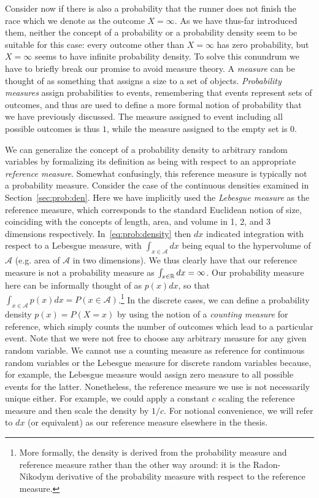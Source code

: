 Consider now if there is also a probability that the runner does not finish the race which
we denote as the outcome $X=\infty$.  As we
have thus-far introduced them, neither the concept of a probability or a probability density
seem to be suitable for this case: every outcome other than $X=\infty$ has zero probability,
but $X=\infty$ seems to have infinite probability density.  To solve this conundrum we 
have to briefly break our promise to avoid measure theory.  A \emph{measure} can be thought of
as something that assigns a size to a set of objects.
\emph{Probability measures} assign probabilities to events, remembering that events represent 
sets of outcomes, and thus are used to define a more formal notion of probability that we have
previously discussed. 
The measure assigned to event including all possible outcomes is thus $1$,
while the measure assigned to the empty set is $0$.  

We can generalize the concept of a probability density to arbitrary random variables
by formalizing its definition as being with respect to an appropriate \emph{reference measure}.  Somewhat confusingly,
this reference measure  is typically not a probability measure.  Consider the case of the continuous densities examined
in Section~\ref{sec:prob:den}.
Here we have implicitly used the \emph{Lebesgue measure} as the reference measure, which corresponds to
the standard Euclidean notion of size, coinciding with the concepts of length, area, and
volume in 1, 2, and 3 dimensions respectively.  In~\eqref{eq:prob:density} then $dx$ indicated 
integration with respect to a Lebesgue measure, with $\int_{x\in\mathcal{A}} dx$ being equal
to the hypervolume of $\mathcal{A}$ (e.g. area of $\mathcal{A}$ in two dimensions).  We thus
clearly have that our reference measure is not a probability measure as $\int_{x\in\mathbb{R}} dx = \infty$.
Our probability measure here can be informally thought of as $p(x)dx$, so that  
$\int_{x\in\mathcal{A}} p(x)dx = P(x\in\mathcal{A})$.\footnote{More formally, the density is derived
	from the probability measure and reference measure rather than the other way around:
	it is the Radon-Nikodym derivative of the probability measure with respect to the reference measure.}
In the discrete cases, we can define a probability density $p(x)=P(X=x)$ by
using the notion of a \emph{counting measure} for reference, which simply counts the number of outcomes which
lead to a particular event.   Note that we were not free to choose any arbitrary measure for any given
random variable.  
We cannot use a counting measure as reference for continuous random variables
or the Lebesgue measure for discrete random variables because, for example, the Lebesgue measure would assign zero
measure to all possible events for the latter.  Nonetheless, the reference measure we use is not necessarily
unique either.  For example, we could apply a constant $c$ scaling the reference measure and
then scale the density by $1/c$.  For notional convenience, we will refer to $dx$ (or equivalent) 
as our reference measure elsewhere in the thesis.

